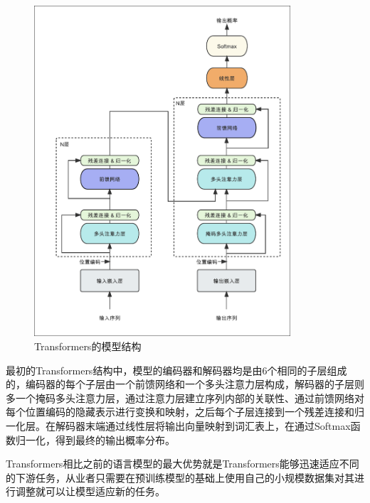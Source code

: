 \documentclass[
    decl-page,  %
    ,fontset = win, %
  ]{njuthesis}
\begin{document}
\begin{figure}[ht]
  \centering
  \includegraphics[width=0.85\textwidth]{image/transformers.pdf}
  \caption{Transformers的模型结构}
  \label{Transformers}
\end{figure}

最初的Transformers结构中，模型的编码器和解码器均是由6个相同的子层组成的，编码器的每个子层由一个前馈网络和一个多头注意力层构成，解码器的子层则多一个掩码多头注意力层，通过注意力层建立序列内部的关联性、通过前馈网络对每个位置编码的隐藏表示进行变换和映射，之后每个子层连接到一个残差连接和归一化层。在解码器末端通过线性层将输出向量映射到词汇表上，在通过Softmax函数归一化，得到最终的输出概率分布。

Transformers相比之前的语言模型的最大优势就是Transformers能够迅速适应不同的下游任务，从业者只需要在预训练模型的基础上使用自己的小规模数据集对其进行调整就可以让模型适应新的任务。

\end{document}
